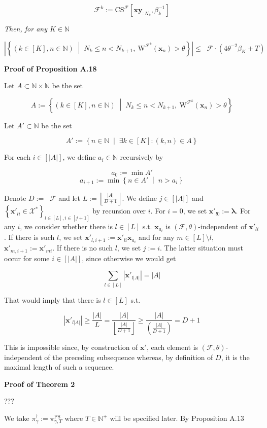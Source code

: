 \documentclass[a4paper]{article}
\newcommand{\Co}[1]{}
\newcommand{\AP}[1]{\left(#1\right)}
\newcommand{\AB}[1]{\left[#1\right]}
\newcommand{\AC}[1]{\left\{#1\right\}}
\newcommand{\ACM}[2]{\left\{#1\;\middle\vert\;#2\right\}}
\newcommand{\Abs}[1]{\left\vert #1 \right\vert}
\newcommand{\Floor}[1]{\left\lfloor #1 \right\rfloor}
\newcommand{\Nats}{\mathbb{N}}
\newcommand{\Estr}{\boldsymbol{\lambda}} %
\DeclareMathOperator{\RVO}{\dim_{RVO}}
\newcommand{\X}{\mathcal{X}}
\newcommand{\PSR}{\text{PS}}
\newcommand{\F}{\mathcal{F}}
\newcommand{\CS}{\mathrm{CS}}
\newcommand{\W}{\mathrm{W}}
\begin{document}
$$\F^k:=\CS^\F\AB{\boldsymbol{xy}_{:N_k},\beta_k^{-1}}$$

\textit{Then, for any $K\in\Nats$}\Co{i}

$$\Abs{\ACM{\AP{k\in[K],n\in\Nats}}{N_k\leq n<N_{k+1},\ \W^{\F^{k}}\AP{\boldsymbol{x}_{n}}>\theta}}\leq\RVO{\F}\cdot\AP{4\theta^{-2}\beta_{K}+T}$$

\textbf{Proof of Proposition A.18}\Co{b}

Let $A\subset\Nats\times\Nats$ be the set

$$A:=\ACM{\AP{k\in[K],n\in\Nats}}{N_k\leq n<N_{k+1},\ \W^{\F^{k}}\AP{\boldsymbol{x}_{n}}>\theta}$$

Let $A'\subset\Nats$ be the set

$$A':=\ACM{n\in\Nats}{\exists k\in[K]:(k,n)\in A}$$

For each $i\in\AB{\Abs{A}}$, we define $a_i\in\Nats$ recursively by

$$a_0:=\min A'$$
$$a_{i+1}:=\min\ACM{n\in A'}{n > a_i}$$

Denote $D:=\RVO{\F}$ and let $L:=\Floor{\frac{\Abs{A}}{D+1}}$. We define $j\in\AB{\Abs{A}}$ and $\AC{\boldsymbol{x}'_{li}\in \X^*}_{l\in[L],i\in\AB{j+1}}$ by recursion over $i$. For $i=0$, we set $\boldsymbol{x}'_{l0}:=\Estr$. For any $i$, we consider whether there is $l\in[L]$ s.t. $\boldsymbol{x}_{a_i}$ is $(\F,\theta)$-independent of $\boldsymbol{x}'_{li}$. If there is such $l$, we set $\boldsymbol{x}'_{l,i+1}:=\boldsymbol{x}'_{li}\boldsymbol{x}_{a_i}$ and for any $m\in[L]\setminus l$, $\boldsymbol{x}'_{m,i+1}:=\boldsymbol{x}'_{mi}$. If there is no such $l$, we set $j:=i$. The latter situation must occur for some $i\in\AB{\Abs{A}}$, since otherwise we would get

$$\sum_{l\in[L]}\Abs{\boldsymbol{x}'_{l\Abs{A}}}=\Abs{A}$$

That would imply that there is $l\in[L]$ s.t.

$$\Abs{\boldsymbol{x}'_{l\Abs{A}}}\geq\frac{\Abs{A}}{L}=\frac{\Abs{A}}{\Floor{\frac{\Abs{A}}{D+1}}}\geq\frac{\Abs{A}}{\AP{\frac{\Abs{A}}{D+1}}}=D+1$$

This is impossible since, by construction of $\boldsymbol{x}'$, each element is $(\F,\theta)$-independent of the preceding subsequence whereas, by definition of $D$, it is the maximal length of such a sequence.

\textbf{Proof of Theorem 2}\Co{b}

???

We take $\pi^\dagger_\gamma:=\pi^\PSR_{\gamma,T}$ where $T\in\Nats^+$ will be specified later. By Proposition A.13
\end{document}
